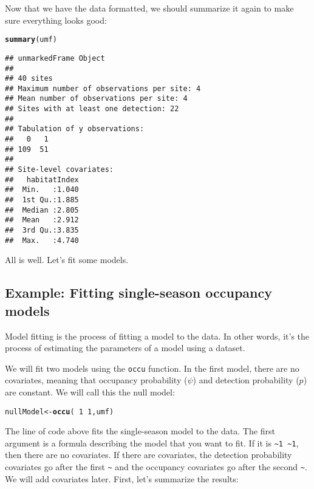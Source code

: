 \documentclass[12pt]{article}\usepackage[]{graphicx}\usepackage[]{xcolor}
\makeatletter
\newcommand{\hlnum}[1]{\textcolor[rgb]{0.686,0.059,0.569}{#1}}%
\newcommand{\hlopt}[1]{\textcolor[rgb]{0,0,0}{#1}}%
\newcommand{\hlstd}[1]{\textcolor[rgb]{0.345,0.345,0.345}{#1}}%
\newcommand{\hlkwb}[1]{\textcolor[rgb]{0.69,0.353,0.396}{#1}}%
\newcommand{\hlkwd}[1]{\textcolor[rgb]{0.737,0.353,0.396}{\textbf{#1}}}%
\newenvironment{kframe}{%
 \def\at@end@of@kframe{}%
 \ifinner\ifhmode%
  \def\at@end@of@kframe{\end{minipage}}%
  \begin{minipage}{\columnwidth}%
 \fi\fi%
 \def\FrameCommand##1{\hskip\@totalleftmargin \hskip-\fboxsep
 \colorbox{shadecolor}{##1}\hskip-\fboxsep
     \hskip-\linewidth \hskip-\@totalleftmargin \hskip\columnwidth}%
 \MakeFramed {\advance\hsize-\width
   \@totalleftmargin\z@ \linewidth\hsize
   \@setminipage}}%
 {\par\unskip\endMakeFramed%
 \at@end@of@kframe}
\newenvironment{knitrout}{}{} %
\makeatother
\begin{document}
Now that we have the data formatted, we should summarize it again to
make sure everything looks good: 

\begin{knitrout}
\color{fgcolor}\begin{kframe}
\begin{alltt}
\hlkwd{summary}\hlstd{(umf)}
\end{alltt}
\begin{verbatim}
## unmarkedFrame Object
## 
## 40 sites
## Maximum number of observations per site: 4 
## Mean number of observations per site: 4 
## Sites with at least one detection: 22 
## 
## Tabulation of y observations:
##   0   1 
## 109  51 
## 
## Site-level covariates:
##   habitatIndex  
##  Min.   :1.040  
##  1st Qu.:1.885  
##  Median :2.805  
##  Mean   :2.912  
##  3rd Qu.:3.835  
##  Max.   :4.740
\end{verbatim}
\end{kframe}
\end{knitrout}

All is well. Let's fit some models. 



\subsection*{Example: Fitting single-season occupancy models}

Model fitting is the process of fitting a model to the data. In other
words, it's the process of estimating the parameters of a model using
a dataset. 

We will fit two models using the \texttt{occu} function. In the first
model, there are no covariates, meaning that occupancy probability
($\psi$) and detection probability ($p$) are constant. We will call
this the null model: 

\begin{knitrout}
\color{fgcolor}\begin{kframe}
\begin{alltt}
\hlstd{nullModel} \hlkwb{<-} \hlkwd{occu}\hlstd{(}\hlopt{~}\hlnum{1} \hlopt{~}\hlnum{1}\hlstd{, umf)}
\end{alltt}
\end{kframe}
\end{knitrout}

The line of code above fits the single-season model to the data. The
first argument is a formula 
describing the model that you want to fit. If it is \verb+~1 ~1+, then
there are no covariates. If there are covariates, the detection
probability covariates go after the first \verb+~+ and the occupancy
covariates go after the second \verb+~+. We will add covariates
later. First, let's summarize the results: 
\end{document}
